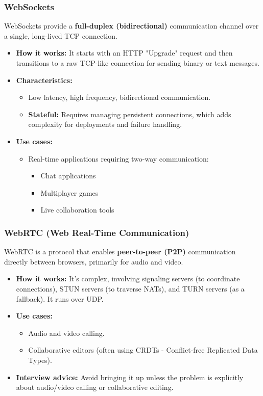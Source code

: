 \documentclass{article}
\begin{document}
\subsubsection{WebSockets}
WebSockets provide a \textbf{full-duplex (bidirectional)} communication channel over a single, long-lived TCP connection.
\begin{itemize}
    \item \textbf{How it works:} It starts with an HTTP "Upgrade" request and then transitions to a raw TCP-like connection for sending binary or text messages.
    \item \textbf{Characteristics:}
    \begin{itemize}
        \item Low latency, high frequency, bidirectional communication.
        \item \textbf{Stateful:} Requires managing persistent connections, which adds complexity for deployments and failure handling.
    \end{itemize}
    \item \textbf{Use cases:}
    \begin{itemize}
        \item Real-time applications requiring two-way communication:
        \begin{itemize}
            \item Chat applications
            \item Multiplayer games
            \item Live collaboration tools
        \end{itemize}
    \end{itemize}
\end{itemize}

\subsubsection{WebRTC (Web Real-Time Communication)}
WebRTC is a protocol that enables \textbf{peer-to-peer (P2P)} communication directly between browsers, primarily for audio and video.
\begin{itemize}
    \item \textbf{How it works:} It's complex, involving signaling servers (to coordinate connections), STUN servers (to traverse NATs), and TURN servers (as a fallback). It runs over UDP.
    \item \textbf{Use cases:}
    \begin{itemize}
        \item Audio and video calling.
        \item Collaborative editors (often using CRDTs - Conflict-free Replicated Data Types).
    \end{itemize}
    \item \textbf{Interview advice:} Avoid bringing it up unless the problem is explicitly about audio/video calling or collaborative editing.
\end{itemize}
\end{document}
